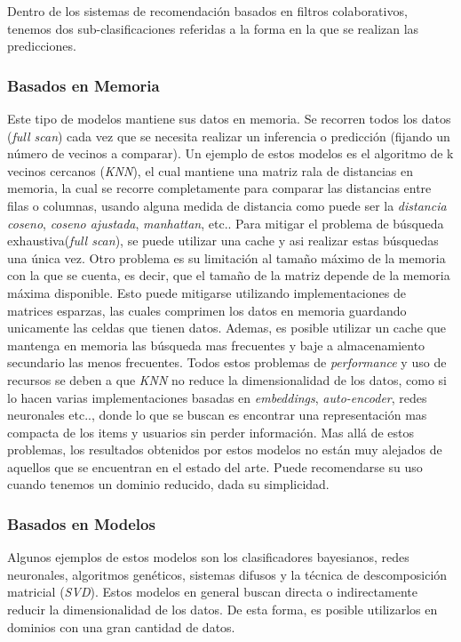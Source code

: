 \documentclass[11pt,a4paper,twoside]{thesis}
\begin{document}
Dentro de los sistemas de recomendación basados en filtros colaborativos, tenemos dos sub-clasificaciones referidas a la forma en la que se realizan las predicciones.

 \subsubsection{Basados en Memoria} 
 
 Este tipo de modelos mantiene sus datos en memoria. Se recorren todos los datos (\textit{full scan}) cada vez que se necesita realizar un inferencia o predicción (fijando un número de vecinos a comparar). Un ejemplo de estos modelos es el algoritmo de k vecinos cercanos (\textit{KNN}), el cual mantiene una matriz rala de distancias en memoria, la cual se recorre completamente para comparar las distancias entre filas o columnas, usando alguna medida de distancia como puede ser la \textit{distancia coseno}, \textit{coseno ajustada}, \textit{manhattan}, etc..
 Para mitigar el problema de búsqueda exhaustiva(\textit{full scan}), se puede utilizar una cache y asi realizar estas búsquedas una única vez. Otro problema es su limitación al tamaño máximo de la memoria con la que se cuenta, es decir, que el tamaño de la matriz depende de la memoria máxima disponible. Esto puede mitigarse utilizando implementaciones de matrices esparzas, las cuales comprimen los datos en memoria guardando unicamente las celdas que tienen datos. Ademas, es posible utilizar un cache que mantenga en memoria las búsqueda mas frecuentes y baje a almacenamiento secundario las menos frecuentes. Todos estos problemas de \textit{performance} y uso de recursos se deben a que \textit{KNN} no reduce la dimensionalidad de los datos, como si lo hacen varias implementaciones basadas en \textit{embeddings}, \textit{auto-encoder}, redes neuronales etc.., donde lo que se buscan es encontrar una representación mas compacta de los items y usuarios sin perder información. Mas allá de estos problemas, los resultados obtenidos por estos modelos no están muy alejados de aquellos que se encuentran en el estado del arte. Puede recomendarse su uso cuando tenemos un dominio reducido, dada su simplicidad. 


 \subsubsection{Basados en Modelos}
 
Algunos ejemplos de estos modelos son los clasificadores bayesianos, redes neuronales, algoritmos genéticos, sistemas difusos y la técnica de descomposición matricial (\textit{SVD}). Estos modelos en general buscan directa o indirectamente reducir la dimensionalidad de los datos. De esta forma, es posible utilizarlos en dominios con una gran cantidad de datos.
\end{document}
